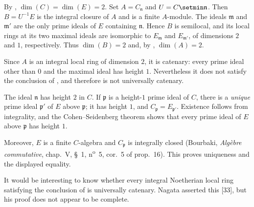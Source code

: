 \begin{example}[5.6.11]
By , $\dim(C)=\dim(E)=2$.
Set $A=C_{\mathfrak n}$ and $U=C\setmin\mathfrak n$.  Then $B=U^{-1}E$
is the integral closure of $A$ and is a finite $A$-module.  The
ideals $\mathfrak m$ and $\mathfrak m'$ are the only prime ideals of
$E$ containing $\mathfrak n$.  Hence $B$ is semilocal, and its local
rings at its two maximal ideals are isomorphic to
$E_{\mathfrak m}$ and $E_{\mathfrak m'}$, of dimensions $2$ and
$1$, respectively.  Thus $\dim(B)=2$ and, by
, $\dim(A)=2$.

Since $A$ is an integral local ring of dimension $2$, it is
catenary: every prime ideal other than $0$ and the maximal ideal has
height $1$.  Nevertheless it does not satisfy the conclusion of
, and therefore is not universally catenary.

The ideal $\mathfrak n$ has height $2$ in $C$.  If $\mathfrak p$ is
a height-$1$ prime ideal of $C$, there is a \emph{unique} prime ideal
$\mathfrak p'$ of $E$ above $\mathfrak p$; it has height $1$, and $C_{\mathfrak p}=E_{\mathfrak p'}$.
Existence follows from integrality, and the Cohen--Seidenberg theorem
shows that every prime ideal of $E$ above $\mathfrak p$ has height
$1$.


Moreover, $E$ is a finite $C$-algebra and
$C_{\mathfrak p}$ is integrally closed
(Bourbaki, \emph{Alg\`ebre commutative}, chap.~V, \S~1,
n\textsuperscript{o}~5, cor.~5 of prop.~16).  This proves uniqueness
and the displayed equality.

It would be interesting to know whether every integral Noetherian
local ring satisfying the conclusion of  is
universally catenary.  Nagata asserted this [33], but his proof does
not appear to be complete.
\end{example}
